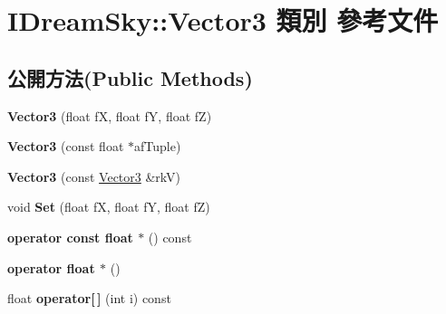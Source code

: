 \hypertarget{class_i_dream_sky_1_1_vector3}{}\section{I\+Dream\+Sky\+:\+:Vector3 類別 參考文件}
\label{class_i_dream_sky_1_1_vector3}
\subsection*{公開方法(Public Methods)}
\begin{DoxyCompactItemize}
\item 
{\bfseries Vector3} (float fX, float fY, float fZ)\hypertarget{class_i_dream_sky_1_1_vector3_a5bc5e7ee3cf741fa30384c474b17dba7}{}\label{class_i_dream_sky_1_1_vector3_a5bc5e7ee3cf741fa30384c474b17dba7}

\item 
{\bfseries Vector3} (const float $\ast$af\+Tuple)\hypertarget{class_i_dream_sky_1_1_vector3_aadb756fd80716da5a4cbe594cabebe22}{}\label{class_i_dream_sky_1_1_vector3_aadb756fd80716da5a4cbe594cabebe22}

\item 
{\bfseries Vector3} (const \hyperlink{class_i_dream_sky_1_1_vector3}{Vector3} \&rkV)\hypertarget{class_i_dream_sky_1_1_vector3_a5803db0541eeb95271c10e9881cb20cc}{}\label{class_i_dream_sky_1_1_vector3_a5803db0541eeb95271c10e9881cb20cc}

\item 
void {\bfseries Set} (float fX, float fY, float fZ)\hypertarget{class_i_dream_sky_1_1_vector3_a2185b9508e34bcda209a8455beed04f1}{}\label{class_i_dream_sky_1_1_vector3_a2185b9508e34bcda209a8455beed04f1}

\item 
{\bfseries operator const float $\ast$} () const \hypertarget{class_i_dream_sky_1_1_vector3_a1ef77371e5d2faa26089483887fa1dac}{}\label{class_i_dream_sky_1_1_vector3_a1ef77371e5d2faa26089483887fa1dac}

\item 
{\bfseries operator float $\ast$} ()\hypertarget{class_i_dream_sky_1_1_vector3_a0b4555775747900a43b53fd9f7ae189a}{}\label{class_i_dream_sky_1_1_vector3_a0b4555775747900a43b53fd9f7ae189a}

\item 
float {\bfseries operator\mbox{[}$\,$\mbox{]}} (int i) const \hypertarget{class_i_dream_sky_1_1_vector3_a4ffbc02f75a6ad56cd22576243d49b46}{}\label{class_i_dream_sky_1_1_vector3_a4ffbc02f75a6ad56cd22576243d49b46}


\end{DoxyCompactItemize}
